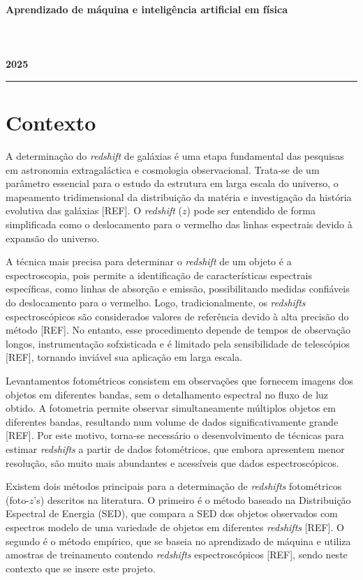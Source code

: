 
\begin{center}
    {\Large \textbf{Aprendizado de máquina e inteligência artificial em física} \hspace{0.5cm}}\\
    \vspace{0.3 cm}
	\vspace{0.3 cm}
	\\
        \\
        \\
	\vspace{0.3 cm}
	\textbf{2025}
\end{center}    
\rule{\textwidth}{0.5pt}

\section{Contexto}\label{sec:contexto}

A determinação do \textit{redshift} de galáxias é uma etapa fundamental das pesquisas em astronomia extragaláctica e cosmologia observacional. Trata-se de um parâmetro essencial para o estudo da estrutura em larga escala do universo, o mapeamento tridimensional da distribuição da matéria e investigação da história evolutiva das galáxias [REF]. O \textit{redshift} ($z$) pode ser entendido de forma simplificada como o deslocamento para o vermelho das linhas espectrais devido à expansão do universo. 

A técnica mais precisa para determinar o \textit{redshift} de um objeto é a espectroscopia, pois permite a identificação de características espectrais específicas, como linhas de absorção e emissão, possibilitando medidas confiáveis do deslocamento para o vermelho. Logo, tradicionalmente, os \textit{redshifts} espectroscópicos são considerados valores de referência devido à alta precisão do método [REF]. No entanto, esse procedimento depende de tempos de observação longos, instrumentação sofxisticada e é limitado pela sensibilidade de telescópios [REF], tornando inviável sua aplicação em larga escala.

Levantamentos fotométricos consistem em observações que fornecem imagens dos objetos em diferentes bandas, sem o detalhamento espectral no fluxo de luz obtido. A fotometria permite observar simultaneamente múltiplos objetos em diferentes bandas, resultando num volume de dados significativamente grande [REF]. Por este motivo, torna-se necessário o desenvolvimento de técnicas para estimar \textit{redshifts} a partir de dados fotométricos, que embora apresentem menor resolução, são muito mais abundantes e acessíveis que dados espectroscópicos.

Existem dois métodos principais para a determinação de \textit{redshifts} fotométricos (foto-$z$'s) descritos na literatura. O primeiro é o método baseado na Distribuição Espectral de Energia (SED), que compara a SED dos objetos observados com espectros modelo de uma variedade de objetos em diferentes \textit{redshifts} [REF]. O segundo é o método empírico, que se baseia no aprendizado de máquina e utiliza amostras de treinamento contendo \textit{redshifts} espectroscópicos [REF], sendo neste contexto que se insere este projeto.
